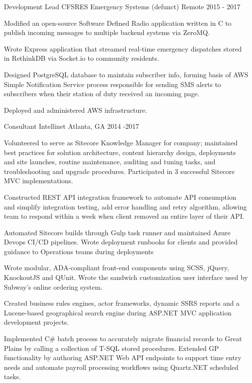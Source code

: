 \begin{cventries}
  \cventry
    {Development Lead} %
    {CFSRES Emergency Systems (defunct)} %
    {Remote} %
    {2015 - 2017} %
    {
      \begin{cvitems} %
        \item {Modified an open-source Software Defined Radio application written in C to publish incoming messages to multiple backend systems via ZeroMQ.}
        \item {Wrote Express application that streamed real-time emergency dispatches stored in RethinkDB via Socket.io to community residents.}
        \item {Designed PostgreSQL database to maintain subscriber info, forming basis of AWS Simple Notification Service process responsible for sending SMS alerts to subscribers when their station of duty received an incoming page.}
        \item {Deployed and administered AWS infrastructure.}
      \end{cvitems}
    }

  \cventry
    {Consultant} %
    {Intellinet} %
    {Atlanta, GA} %
    {2014 -2017 } %
    {
      \begin{cvitems} %
        \item {Volunteered to serve as Sitecore Knowledge Manager for company; maintained best practices for solution architecture, content hierarchy design, deployments and site launches, routine maintenance, auditing and tuning tasks, and troubleshooting and upgrade procedures. Participated in 3 successful Sitecore MVC implementations.}
		\item {Constructed REST API integration framework to automate API consumption and simplify integration testing, add error handling and retry algorithm, allowing team to respond within a week when client removed an entire layer of their API.}
		\item {Automated Sitecore builds through Gulp task runner and maintained Azure Devops CI/CD pipelines. Wrote deployment runbooks for clients and provided guidance to Operations teams during deployments}
		\item {Wrote modular, ADA-compliant front-end components using SCSS, jQuery, KnockoutJS and QUnit. Wrote the sandwich customization user interface used by Subway’s online ordering system.}
		\item {Created business rules engines, actor frameworks, dynamic SSRS reports and a Lucene-based geographical search engine during ASP.NET MVC application development projects.}
		\item {Implemented C# batch process to accurately migrate financial records to Great Plains by calling a collection of T-SQL stored procedures. Extended GP functionality by authoring ASP.NET Web API endpoints to support time entry needs and automate payroll processing workflows using Quartz.NET scheduled tasks.}
      \end{cvitems}
    }


\end{cventries}
